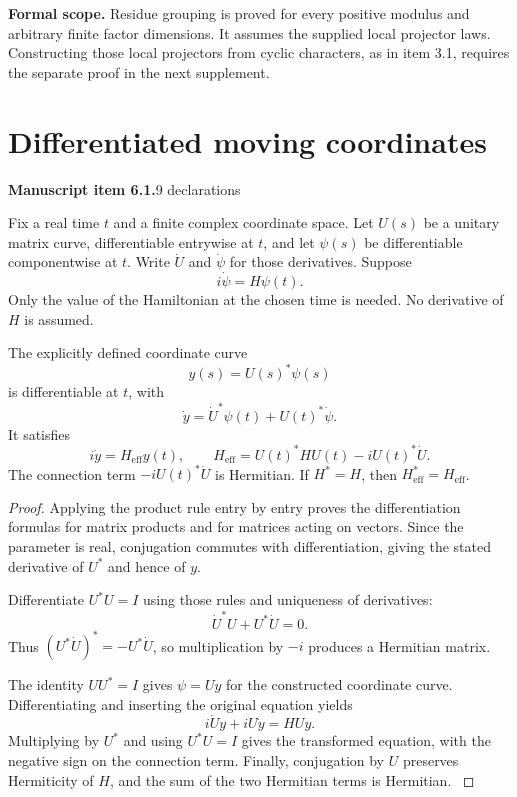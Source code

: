 \textbf{Formal scope.} Residue grouping is proved for every positive modulus and arbitrary finite factor dimensions. It assumes the supplied local projector laws. Constructing those local projectors from cyclic characters, as in item 3.1, requires the separate proof in the next supplement.





\section{Differentiated moving coordinates}\label{supp2:section:003}
\textbf{Manuscript item 6.1.}\quad {}\hfill 9 declarations

Fix a real time $t$ and a finite complex coordinate space. Let $U(s)$ be a unitary matrix curve, differentiable entrywise at $t$, and let $\psi(s)$ be differentiable componentwise at $t$. Write $\dot U$ and $\dot\psi$ for those derivatives. Suppose
\[
 i\dot\psi=H\psi(t).
\]
Only the value of the Hamiltonian at the chosen time is needed. No derivative of $H$ is assumed.

\begin{statement}\label{supp2:statement:003}
The explicitly defined coordinate curve
\[
 y(s)=U(s)^*\psi(s)
\]
is differentiable at $t$, with
\[
 \dot y=\dot U^*\psi(t)+U(t)^*\dot\psi.
\]
It satisfies
\[
 \boxed{\quad i\dot y=H_{\mathrm{eff}}y(t),\qquad
 H_{\mathrm{eff}}=U(t)^*HU(t)-iU(t)^*\dot U.\quad}
\]
The connection term $-iU(t)^*\dot U$ is Hermitian. If $H^*=H$, then $H_{\mathrm{eff}}^*=H_{\mathrm{eff}}$.
\end{statement}

\begin{proof}\label{supp2:proof:003}
Applying the product rule entry by entry proves the differentiation formulas for matrix products and for matrices acting on vectors. Since the parameter is real, conjugation commutes with differentiation, giving the stated derivative of $U^*$ and hence of $y$.

Differentiate $U^*U=I$ using those rules and uniqueness of derivatives:
\[
 \dot U^*U+U^*\dot U=0.
\]
Thus $(U^*\dot U)^*=-U^*\dot U$, so multiplication by $-i$ produces a Hermitian matrix.

The identity $UU^*=I$ gives $\psi=Uy$ for the constructed coordinate curve. Differentiating and inserting the original equation yields
\[
 i\dot U y+iU\dot y=HUy.
\]
Multiplying by $U^*$ and using $U^*U=I$ gives the transformed equation, with the negative sign on the connection term. Finally, conjugation by $U$ preserves Hermiticity of $H$, and the sum of the two Hermitian terms is Hermitian.
\label{supp2:proof:003:end}\end{proof}

